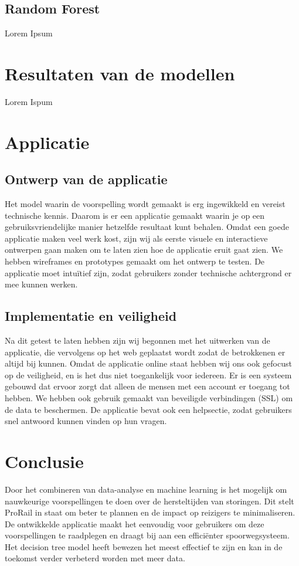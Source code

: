 \documentclass{article}
\begin{document}
\subsection{Random Forest}
Lorem Ipsum

\section{Resultaten van de modellen}
Lorem Ispum

\newpage
\section{Applicatie}

\subsection{Ontwerp van de applicatie}
Het model waarin de voorspelling wordt gemaakt is erg ingewikkeld en vereist technische kennis. Daarom is er een applicatie gemaakt waarin je op een gebruiksvriendelijke manier hetzelfde resultaat kunt behalen. Omdat een goede applicatie maken veel werk kost, zijn wij als eerste visuele en interactieve ontwerpen gaan maken om te laten zien hoe de applicatie eruit gaat zien. We hebben wireframes en prototypes gemaakt om het ontwerp te testen. De applicatie moet intuïtief zijn, zodat gebruikers zonder technische achtergrond er mee kunnen werken.

\subsection{Implementatie en veiligheid}
Na dit getest te laten hebben zijn wij begonnen met het uitwerken van de applicatie, die vervolgens op het web geplaatst wordt zodat de betrokkenen er altijd bij kunnen. Omdat de applicatie online staat hebben wij ons ook gefocust op de veiligheid, en is het dus niet toegankelijk voor iedereen. Er is een systeem gebouwd dat ervoor zorgt dat alleen de mensen met een account er toegang tot hebben. We hebben ook gebruik gemaakt van beveiligde verbindingen (SSL) om de data te beschermen. De applicatie bevat ook een helpsectie, zodat gebruikers snel antwoord kunnen vinden op hun vragen.

\newpage
\section{Conclusie}
Door het combineren van data-analyse en machine learning is het mogelijk om nauwkeurige voorspellingen te doen over de hersteltijden van storingen. Dit stelt ProRail in staat om beter te plannen en de impact op reizigers te minimaliseren. De ontwikkelde applicatie maakt het eenvoudig voor gebruikers om deze voorspellingen te raadplegen en draagt bij aan een efficiënter spoorwegsysteem. Het decision tree model heeft bewezen het meest effectief te zijn en kan in de toekomst verder verbeterd worden met meer data.
\end{document}
